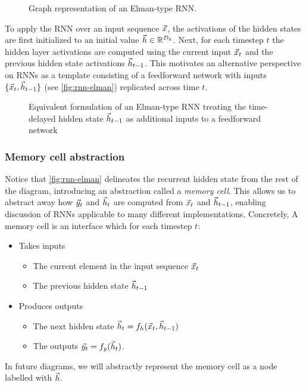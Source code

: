 \documentclass[dissertation.tex]{subfiles}
\begin{document}

\begin{figure}[htpb]
    \centering
    
    \caption{Graph representation of an Elman-type RNN.}
    \label{fig:nn-rnn}
\end{figure}

To apply the RNN over an input sequence $\vec{x}$, the activations of the hidden
states are first initialized to an initial value $\vec{h} \in \mathbb{R}^{D_{h}}$. Next,
for each timestep $t$ the hidden layer activations are computed using the
current input $\vec{x}_t$ and the previous hidden state activations $\vec{h}_{t-1}$.
This motivates an alternative perspective on RNNs as a template consisting
of a feedforward network with inputs $\{\vec{x}_t, \vec{h}_{t-1}\}$ (see
\autoref{fig:rnn-elman}) replicated across time $t$.

\begin{figure}[htpb]
    \centering
    
    \caption{Equivalent formulation of an Elman-type RNN treating the
    time-delayed hidden state $\vec{h}_{t-1}$ as additional inputs to a feedforward
    network}
    \label{fig:rnn-elman}
\end{figure}


\subsubsection{Memory cell abstraction}

Notice that \autoref{fig:rnn-elman} delineates the recurrent hidden state from
the rest of the diagram, introducing an abstraction called a \emph{memory
cell}. This allows us to abstract away how $\vec{y}_t$ and $\vec{h}_t$ are computed from
$\vec{x}_t$ and $\vec{h}_{t-1}$, enabling discussion of RNNs applicable to many different
implementations. Concretely, A memory cell is an interface which for each
timestep $t$:
\begin{itemize}
    \item Takes inputs
        \begin{itemize}
            \item The current element in the input sequence $\vec{x}_t$
            \item The previous hidden state $\vec{h}_{t-1}$
        \end{itemize}
    \item Produces outputs
        \begin{itemize}
            \item The next  hidden state $\vec{h}_t = f_h (\vec{x}_t, \vec{h}_{t-1})$
            \item The outputs $\vec{y}_t = f_y (\vec{h}_t)$.
        \end{itemize}
\end{itemize}
In future diagrams, we will abstractly represent the memory cell
as a node labelled with $\vec{h}$.
\end{document}
